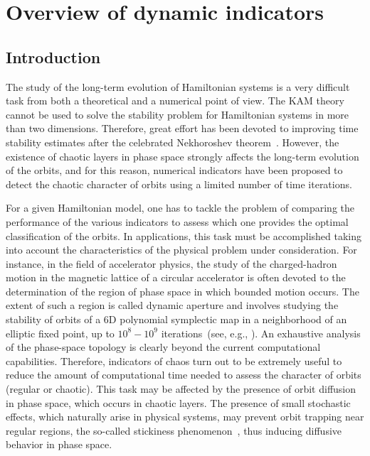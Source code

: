 \chapter{Overview of dynamic indicators}

\section{\label{sec:intro}Introduction}
%
The study of the long-term evolution of Hamiltonian systems is a very difficult task from both a theoretical and a numerical point of view. The KAM theory\cite{KAM4} cannot be used to solve the stability problem for Hamiltonian systems in more than two dimensions. Therefore, great effort has been devoted to improving time stability estimates after the celebrated Nekhoroshev theorem~\cite{Nekhoroshev:1977aa}. However, the existence of chaotic layers in phase space strongly affects the long-term evolution of the orbits, and for this reason, numerical indicators have been proposed to detect the chaotic character of orbits using a limited number of time iterations. 

For a given Hamiltonian model, one has to tackle the problem of comparing the performance of the various indicators to assess which one provides the optimal classification of the orbits. In applications, this task must be accomplished taking into account the characteristics of the physical problem under consideration. For instance, in the field of accelerator physics, the study of the charged-hadron motion in the magnetic lattice of a circular accelerator is often devoted to the determination of the region of phase space in which bounded motion occurs. The extent of such a region is called dynamic aperture and involves studying the stability of orbits of a 6D polynomial symplectic map in a neighborhood of an elliptic fixed point, up to $10^8-10^9$ iterations~(see, e.g., \cite{Bazzani:262179}). An exhaustive analysis of the phase-space topology is clearly beyond the current computational capabilities. Therefore, indicators of chaos turn out to be extremely useful to reduce the amount of computational time needed to assess the character of orbits (regular or chaotic). This task may be affected by the presence of orbit diffusion in phase space, which occurs in chaotic layers. The presence of small stochastic effects, which naturally arise in physical systems, may prevent orbit trapping near regular regions, the so-called stickiness phenomenon~\cite{Kandrup1999DiffusionAS,SZEZECH2005394}, thus inducing diffusive behavior in phase space. 

